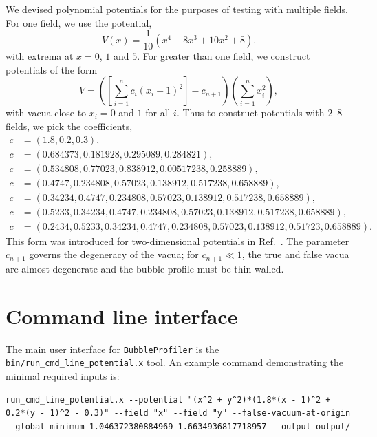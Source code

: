 \documentclass[final,3p,11pt,pdflatex]{elsarticle}
\makeatletter
\renewcommand{\tfrac}{\frac}
\newcommand{\bp}{\texttt{BubbleProfiler}\@\xspace}
\newcommand{\code}[1]{\ifmmode\text{\nolinkurl{#1}}\else\nolinkurl{#1}\fi}
\newcommand{\refcite}[1]{Ref.~\cite{#1}}
\makeatother
\begin{document}
We devised polynomial potentials for the purposes of testing with multiple
fields. For one field, we use the potential,
\begin{equation}
V(x) = \tfrac{1}{10}\left(x^4 -8 x^3 + 10 x^2 + 8\right).
\end{equation}
with extrema at $x = 0$, $1$ and $5$. For greater than one field, we construct potentials of the form
\begin{equation}
V = \left( \left[\sum_{i=1}^n c_i (x_i - 1)^2\right] - c_{n+1} \right)\left(\sum_{i=1}^n x_i^2\right),
\end{equation}
with vacua close to $x_i = 0$ and $1$ for all $i$. Thus to construct potentials
with $2$--$8$ fields, we pick the coefficients,
\begin{align}
c&=\left(1.8, 0.2, 0.3\right), \label{eq:2_field_potential}\\
c&=\left(0.684373, 0.181928, 0.295089, 0.284821\right),\\
c&=\left(0.534808, 0.77023, 0.838912, 0.00517238, 0.258889\right),\\
c&=\left(0.4747, 0.234808, 0.57023, 0.138912, 0.517238, 0.658889\right),\\
c&=\left(0.34234, 0.4747, 0.234808, 0.57023, 0.138912, 0.517238, 0.658889
\right),\\
c&=\left(0.5233, 0.34234, 0.4747, 0.234808, 0.57023, 0.138912, 0.517238,
0.658889\right),\\
c&=\left(0.2434, 0.5233, 0.34234, 0.4747, 0.234808, 0.57023, 0.138912,
0.51723, 0.658889\right).
\end{align}
This form was introduced for two-dimensional potentials in
\refcite{Wainwright:2011kj}. The parameter $c_{n+1}$ governs the degeneracy
of the vacua; for $c_{n+1} \ll 1$, the true and false vacua are almost
degenerate and the bubble profile must be thin-walled.

\section{Command line interface}
\label{sec:User-Options}
The main user interface for \bp is the \code{bin/run_cmd_line_potential.x} tool.
An example command demonstrating the minimal required inputs is:

\begin{lstlisting}[language={}]
run_cmd_line_potential.x --potential "(x^2 + y^2)*(1.8*(x - 1)^2 + 0.2*(y - 1)^2 - 0.3)" --field "x" --field "y" --false-vacuum-at-origin --global-minimum 1.046372380884969 1.6634936817718957 --output output/
\end{lstlisting}
\end{document}
